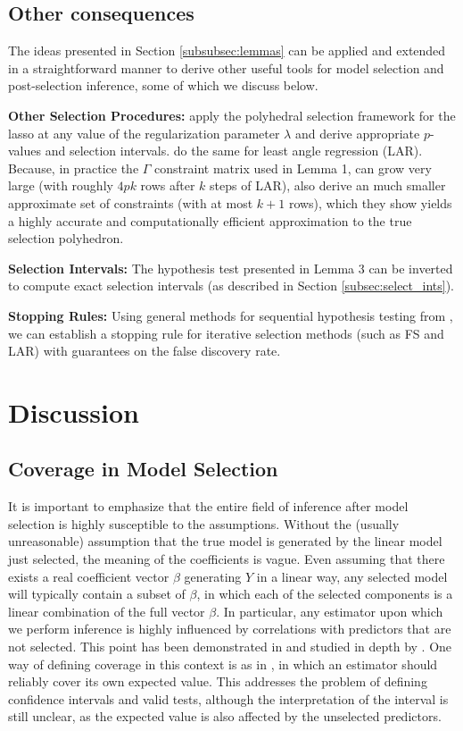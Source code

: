 \documentclass{article}
\begin{document}
\subsection{Other consequences}
The ideas presented in Section \ref{subsubsec:lemmas} can be applied and
extended in a straightforward manner to derive other useful tools for model
selection and post-selection inference, some of which we discuss below.

{\bf Other Selection Procedures:} \citet{lee13lasso} apply the polyhedral
selection framework for the lasso at any value of the regularization parameter
$\lambda$ and derive appropriate $p$-values and selection intervals.
\citet{taylor14post} do the same for least angle regression (LAR). Because, in
practice the $\Gamma$ constraint matrix used in Lemma 1, can grow very large
(with roughly $4pk$ rows after $k$ steps of LAR), \citet{taylor14post} also
derive an much smaller approximate set of constraints (with at most $k + 1$
rows), which they show yields a highly accurate and computationally efficient
approximation to the true selection polyhedron.

{\bf Selection Intervals:} The hypothesis test presented in Lemma 3 can be
inverted to compute exact selection intervals (as described in Section
\ref{subsec:select_ints}).

{\bf Stopping Rules:} Using general methods for sequential hypothesis testing
from \citet{gsell13sequentialSelection}, we can establish a stopping rule for
iterative selection methods (such as FS and LAR) with guarantees on the false
discovery rate.

\section{Discussion}
\subsection{Coverage in Model Selection}
\label{subsec:coverage}
It is important to emphasize that the entire field of inference after model
selection is highly susceptible to the assumptions. Without the (usually
unreasonable) assumption that the true model is generated by the linear model
just selected, the meaning of the coefficients is vague. Even assuming that
there exists a real coefficient vector $\beta$ generating $Y$ in a linear way,
any selected model will typically contain a subset of $\beta$, in which each of
the selected components is a linear combination of the full vector $\beta$. In
particular, any estimator upon which we perform inference is highly influenced
by correlations with predictors that are not selected. This point has been
demonstrated in and studied in depth by \citet{gsell13false}.
One way of defining coverage in this context is as in \citet{berk13PoSI}, in
which an estimator should reliably cover its own expected value. This addresses
the problem of defining confidence intervals and valid tests, although the
interpretation of the interval is still unclear, as the expected value is also
affected by the unselected predictors.
\end{document}

